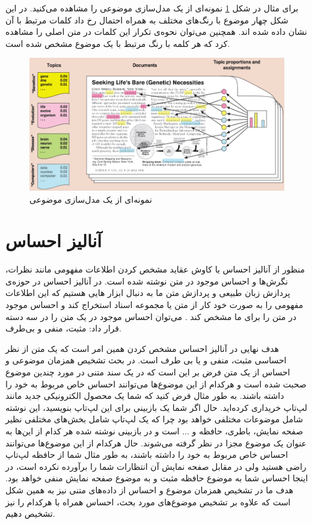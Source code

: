 برای مثال در شکل
\ref{fig2}
نمونه‌ای از یک مدل‌سازی موضوعی را مشاهده می‌‌کنید. در این شکل چهار موضوع با رنگ‌های مختلف به همراه احتمال رخ داد کلمات مرتبط با آن نشان داده شده اند. همچنین می‌‌توان نحوه‌ی تکرار این کلمات در متن اصلی‌ را مشاهده کرد که هر کلمه با رنگ مرتبط با یک موضوع مشخص شده است.
\begin{figure}[!t]
	\centering
	\includegraphics[scale=0.5]{chap2-img/topic_model_example2}
	\caption{نمونه‌ای از یک مدل‌سازی موضوعی}
	\label{fig2}
\end{figure}


\section{آنالیز احساس}
منظور از آنالیز احساس یا کاوش عقاید مشخص کردن اطلاعات مفهومی‌
مانند نظرات، نگرش‌ها و احساس موجود در متن نوشته شده است. در آنالیز احساس در حوزه‌ی ‌‌پردازش زبان طبیعی و پردازش متن ما به دنبال ابزار هایی هستیم که این اطلاعات مفهومی‌ را به صورت خود کار از متن یا مجموعه اسناد استخراج کند و احساس موجود در متن را برای ما مشخص کند
\cite{lin2012weakly}\cite{pang2008opinion}.
 می‌توان احساس موجود در یک متن را در سه‌ دسته قرار داد: مثبت، منفی‌ و بی‌طرف.

هدف نهایی در آنالیز احساس مشخص کردن همین امر است  که یک متن از نظر احساسی‌ مثبت، منفی‌ و یا بی‌ طرف است. در بحث تشخیص همزمان موضوعی و احساس از یک متن فرض بر این است که در یک سند متنی در مورد چندین موضوع صحبت شده است و هرکدام از این موضوع‌ها می‌‌توانند احساس خاص مربوط به خود را داشته باشند. به طور مثال فرض کنید که شما یک محصول الکترونیکی جدید مانند لپ‌تاپ خریداری کرده‌اید. حال اگر شما یک بازبینی
برای این لپ‌تاپ بنویسید، این نوشته شامل موضوعات مختلفی‌ خواهد بود چرا که یک لپ‌تاپ شامل بخش‌های مختلفی‌ نظیر صفحه نمایش، باطری، حافظه و ... است و در بازبینی نوشته شده هر کدام از این‌ها به عنوان یک موضوع مجزا در نظر گرفته می‌‌شوند. حال هرکدام از این موضوع‌ها می‌‌توانند احساس خاص مربوط به خود را داشته باشند، به طور مثال شما از حافظه لپ‌تاپ راضی‌ هستید ولی‌ در مقابل صفحه نمایش آن انتظارات شما را برآورده نکرده است، در اینجا احساس شما به موضوع حافظه مثبت و به موضوع صفحه نمایش منفی‌ خواهد بود. هدف ما در تشخیص همزمان موضوع و احساس از داده‌های متنی نیز به همین شکل است که علاوه بر تشخیص موضوع‌های مورد بحث، احساس همراه با هرکدام را نیز تشخیص دهیم.


